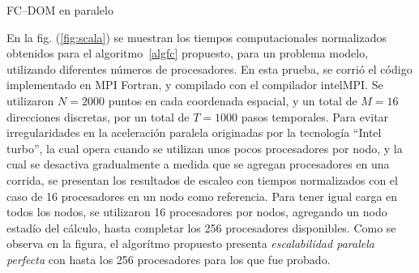\begin{algorithm}
\caption{FC--DOM en paralelo}\label{algfc}
\end{algorithm}


En la fig. (\ref{fig:scala}) se muestran los tiempos computacionales 
normalizados obtenidos 
para el algoritmo~\eqref{algfc} propuesto, para un 
problema modelo, utilizando diferentes números de procesadores. 
En esta prueba, se corrió el código implementado en MPI Fortran, 
y compilado con el compilador intelMPI. Se utilizaron $N=2000$ 
puntos en cada coordenada espacial, y un total de $M=16$ direcciones 
discretas, por un total de $T=1000$ pasos temporales. 
Para evitar irregularidades en la aceleración paralela 
originadas por la tecnología ``Intel turbo'', la cual 
opera cuando se utilizan unos pocos procesadores por nodo, 
y la cual se desactiva gradualmente a medida que se agregan procesadores 
en una corrida, se presentan los resultados de escaleo 
con tiempos normalizados con el caso de 16 procesadores 
en un nodo como referencia. Para tener igual carga en todos los nodos, 
se utilizaron 16 procesadores por nodos, agregando un nodo 
estadío del cálculo, hasta completar los 256 procesadores disponibles. 
Como se observa en la figura, el algorítmo propuesto 
presenta \textit{escalabilidad paralela perfecta} 
con hasta los 256 procesadores para los que fue probado.

